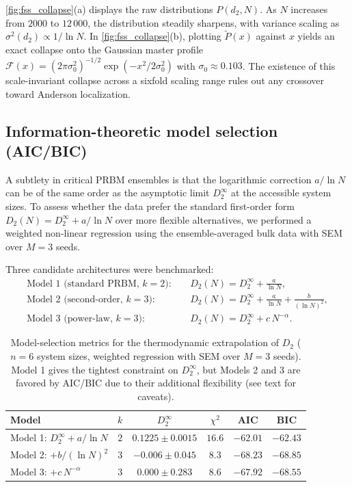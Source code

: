 \documentclass[11pt,a4paper]{article}
\begin{document}
\cref{fig:fss_collapse}(a) displays the raw distributions $P(d_2, N)$. As
$N$ increases from $2000$ to $12\,000$, the distribution steadily sharpens,
with variance scaling as $\sigma^2(d_2) \propto 1/\ln N$. In
\cref{fig:fss_collapse}(b), plotting $\widetilde{P}(x)$ against $x$ yields
an exact collapse onto the Gaussian master profile
$\mathcal{F}(x) = (2\pi \sigma_0^2)^{-1/2} \exp(-x^2 / 2\sigma_0^2)$ with
$\sigma_0 \approx 0.103$. The existence of this scale-invariant collapse
across a sixfold scaling range rules out any crossover toward Anderson
localization.

\subsection{Information-theoretic model selection (AIC/BIC)}
\label{subsec:aic_bic_selection}

A subtlety in critical PRBM ensembles is that the logarithmic correction
$a/\ln N$ can be of the same order as the asymptotic limit $D_2^\infty$
at the accessible system sizes. To assess whether the data prefer the
standard first-order form $D_2(N) = D_2^\infty + a/\ln N$ over more
flexible alternatives, we performed a weighted non-linear regression
using the ensemble-averaged bulk data with SEM over $M = 3$ seeds.

Three candidate architectures were benchmarked:
\begin{align}
\text{Model 1 (standard PRBM, } k=2): \quad
  & D_2(N) = D_2^\infty + \frac{a}{\ln N}, \\
\text{Model 2 (second-order, } k=3): \quad
  & D_2(N) = D_2^\infty + \frac{a}{\ln N} + \frac{b}{(\ln N)^2}, \\
\text{Model 3 (power-law, } k=3): \quad
  & D_2(N) = D_2^\infty + c \, N^{-\alpha}.
\end{align}

\begin{table}[htbp]
\centering
\caption{Model-selection metrics for the thermodynamic extrapolation of
$D_2$ ($n = 6$ system sizes, weighted regression with SEM over $M=3$
seeds). Model 1 gives the tightest constraint on $D_2^\infty$, but
Models 2 and 3 are favored by AIC/BIC due to their additional flexibility
(see text for caveats).}
\label{tab:aic_bic_models}
\begin{tabular}{l c c c c c}
\toprule
\textbf{Model} & $k$ & $D_2^\infty$ & $\chi^2$ & \textbf{AIC} & \textbf{BIC} \\
\midrule
Model 1: $D_2^\infty + a/\ln N$ & $2$ & $0.1225 \pm 0.0015$ & $16.6$ & $-62.01$ & $-62.43$ \\
Model 2: $+ b/(\ln N)^2$        & $3$ & $-0.006 \pm 0.045$  & $8.3$  & $-68.23$ & $-68.85$ \\
Model 3: $+ c\,N^{-\alpha}$     & $3$ & $0.000 \pm 0.283$   & $8.6$  & $-67.92$ & $-68.55$ \\
\bottomrule
\end{tabular}
\end{table}
\end{document}
